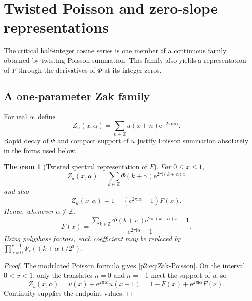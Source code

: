 \documentclass[11pt,oneside]{article}
\newtheorem{theorem}{Theorem}[section]
\theoremstyle{definition}
\newcommand{\e}{\mathrm e}
\newcommand{\ii}{\mathrm i}
\newcommand{\Z}{\mathbb Z}
\begin{document}
\section{Twisted Poisson and zero-slope representations}
\label{p2:sec:Zak}

The critical half-integer cosine series is one member of a continuous family
obtained by twisting Poisson summation.  This family also yields a representation
of $F$ through the derivatives of $\Phi$ at its integer zeros.

\subsection{A one-parameter Zak family}

For real $\alpha$, define
\begin{equation}
 Z_u(x,\alpha)=\sum_{n\in\Z}u(x+n)\e^{-2\pi\ii n\alpha}.   \label{p2:eq:Zak-def}
\end{equation}
Rapid decay of $\Phi$ and compact support of $u$ justify Poisson summation
absolutely in the forms used below.

\begin{theorem}[Twisted spectral representation of $F$]
\label{p2:thm:twisted-F}
For $0\le x\le1$,
\begin{equation}
 Z_u(x,\alpha)
 =\sum_{k\in\Z}\Phi(k+\alpha)
   \e^{2\pi\ii(k+\alpha)x}                                \label{p2:eq:Zak-Poisson}
\end{equation}
and also
\begin{equation}
 Z_u(x,\alpha)=1+(\e^{2\pi\ii\alpha}-1)F(x).             \label{p2:eq:Zak-fold}
\end{equation}
Hence, whenever $\alpha\notin\Z$,
\begin{equation}
 \boxed{\displaystyle
 F(x)=\frac{
   \sum_{k\in\Z}\Phi(k+\alpha)
       \e^{2\pi\ii(k+\alpha)x}-1}
  {\e^{2\pi\ii\alpha}-1}.}                              \label{p2:eq:F-twisted-Poisson}
\end{equation}
Using polyphase factors, each coefficient may be replaced by
$\prod_{a=0}^{r-1}\Psi_r((k+\alpha)/2^a)$.
\end{theorem}

\begin{proof}
The modulated Poisson formula gives \eqref{p2:eq:Zak-Poisson}.  On the interval
$0<x<1$, only the translates $n=0$ and $n=-1$ meet the support of $u$, so
\[
 Z_u(x,\alpha)=u(x)+\e^{2\pi\ii\alpha}u(x-1)
 =1-F(x)+\e^{2\pi\ii\alpha}F(x).
\]
Continuity supplies the endpoint values.
\end{proof}
\end{document}
